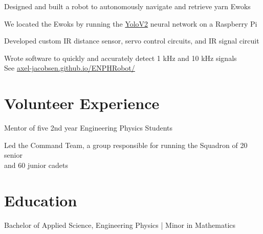 \documentclass[]{deedy-resume-openfont}
\begin{document}
\begin{tightemize}
	\item Designed and built a robot to autonomously navigate and retrieve yarn Ewoks
	\item We located the Ewoks by running the \href{https://pjreddie.com/darknet/yolov2/}{YoloV2} neural network on a Raspberry Pi
	\item Developed custom IR distance sensor, servo control circuits, and IR signal circuit
	\item Wrote software to quickly and accurately detect 1 kHz and 10 kHz signals \\
	See \href{https://axel-jacobsen.github.io/ENPHRobot/}{axel-jacobsen.github.io/ENPHRobot/}
	\vspace{5pt}
\end{tightemize}
\sectionsep

\section{Volunteer Experience}
\begin{tightemize}
	\item Mentor of five 2nd year Engineering Physics Students
\end{tightemize}
\sectionsep

\begin{tightemize}
	\item Led the Command Team, a group responsible for running the Squadron of  20 senior \\ and 60  junior cadets
	\vspace{5pt}
\end{tightemize}
\sectionsep

\section{Education}
\begin{tightemize}
	\item Bachelor of Applied Science, Engineering Physics | Minor in Mathematics \\
\end{tightemize}
\sectionsep
\end{document}
